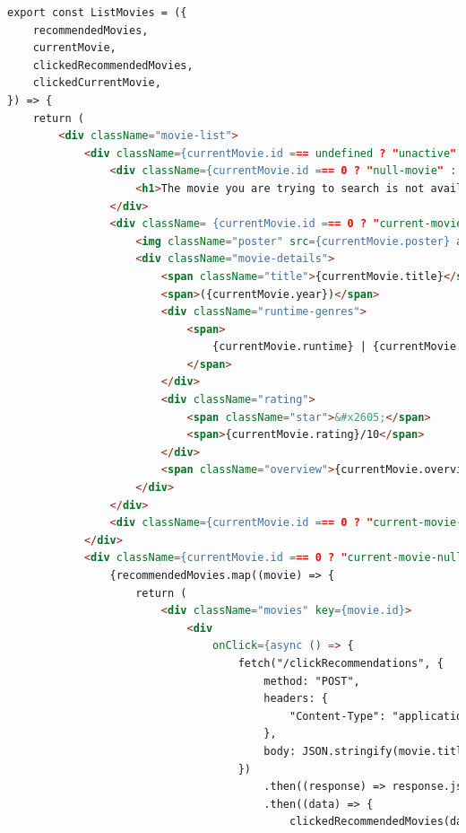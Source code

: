\begin{lstlisting}[language=HTML]
export const ListMovies = ({
    recommendedMovies,
    currentMovie,
    clickedRecommendedMovies,
    clickedCurrentMovie,
}) => {
    return (
        <div className="movie-list">
            <div className={currentMovie.id === undefined ? "unactive" : "active"}>
                <div className={currentMovie.id === 0 ? "null-movie" : "current-movie-null"}>
                    <h1>The movie you are trying to search is not available.</h1>
                </div>
                <div className= {currentMovie.id === 0 ? "current-movie-null" : "current-movie"}>
                    <img className="poster" src={currentMovie.poster} alt="poster"></img>
                    <div className="movie-details">
                        <span className="title">{currentMovie.title}</span>
                        <span>({currentMovie.year})</span>
                        <div className="runtime-genres">
                            <span>
                                {currentMovie.runtime} | {currentMovie.genres}
                            </span>
                        </div>
                        <div className="rating">
                            <span className="star">&#x2605;</span>
                            <span>{currentMovie.rating}/10</span>
                        </div>
                        <span className="overview">{currentMovie.overview}</span>
                    </div>
                </div>
                <div className={currentMovie.id === 0 ? "current-movie-null" : "title-recommended-movies"}> Recommended Movies for you: </div>
            </div>
            <div className={currentMovie.id === 0 ? "current-movie-null" : "list-of-movies"}>
                {recommendedMovies.map((movie) => {
                    return (
                        <div className="movies" key={movie.id}>
                            <div
                                onClick={async () => {
                                    fetch("/clickRecommendations", {
                                        method: "POST",
                                        headers: {
                                            "Content-Type": "application/json",
                                        },
                                        body: JSON.stringify(movie.title),
                                    })
                                        .then((response) => response.json())
                                        .then((data) => {
                                            clickedRecommendedMovies(data.clickedMovies[1].recommended_movies);

\end{lstlisting}
